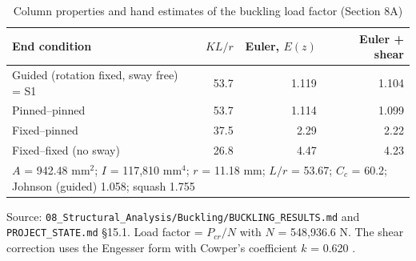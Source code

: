 \begin{table}[htbp]
\centering
\footnotesize
\caption{Column properties and hand estimates of the buckling load factor (Section 8A)}
\label{tab:section}
\begin{tabular}{lrrr}
\toprule
End condition & $KL/r$ & Euler, $E(z)$ & Euler + shear \\
\midrule
Guided (rotation fixed, sway free) = S1 & 53.7 & 1.119 & 1.104 \\
Pinned--pinned & 53.7 & 1.114 & 1.099 \\
Fixed--pinned & 37.5 & 2.29 & 2.22 \\
Fixed--fixed (no sway) & 26.8 & 4.47 & 4.23 \\
\midrule
\multicolumn{4}{l}{$A$ = 942.48 mm$^2$; $I$ = 117,810 mm$^4$; $r$ = 11.18 mm; $L/r$ = 53.67; $C_c$ = 60.2; Johnson (guided) 1.058; squash 1.755} \\
\bottomrule
\end{tabular}
\par\smallskip\parbox{\linewidth}{\footnotesize\raggedright Source: \texttt{08\_Structural\_Analysis/Buckling/BUCKLING\_RESULTS.md} and \texttt{PROJECT\_STATE.md} \S15.1. Load factor = $P_{cr}/N$ with $N$ = 548,936.6 N. The shear correction uses the Engesser form with Cowper's coefficient $k$ = 0.620 \cite{cowper1966}.}
\end{table}
